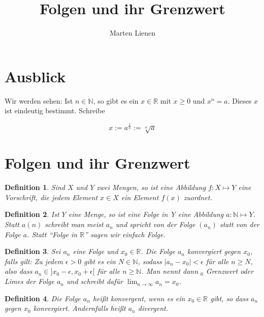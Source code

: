 \documentclass[a4paper,10pt]{article}
\title{Folgen und ihr Grenzwert}
\author{Marten Lienen}
\newtheorem{definition}{Definition}
\begin{document}
\maketitle

\section*{Ausblick}

Wir werden sehen: Ist $n \in \mathbb{N}$, so gibt es ein $x \in \mathbb{R}$ mit $x \ge 0$ und $x^n = a$.
Dieses $x$ ist eindeutig bestimmt. Schreibe

\begin{equation}
 x := a^{\frac{1}{n}} := \sqrt[n]{a}
\end{equation}

\section{Folgen und ihr Grenzwert}

\begin{definition}
 Sind $X$ und $Y$ zwei Mengen, so ist eine Abbildung $f: X \mapsto Y$ eine Vorschrift, die jedem Element $x \in X$ ein Element $f(x)$ zuordnet.
\end{definition}

\begin{definition}
 Ist $Y$ eine Menge, so ist eine Folge in Y eine Abbildung $a: \mathbb{N} \mapsto Y$.
 Statt $a(n)$ schreibt man meist $a_n$ und spricht von der Folge $(a_n)$ statt von der Folge $a$.
 Statt ``Folge in $\mathbb{R}$'' sagen wir einfach Folge.
\end{definition}

\begin{definition}
 Sei $a_n$ eine Folge und $x_0 \in \mathbb{R}$.
 Die Folge $a_n$ konvergiert gegen $x_0$, falls gilt: Zu jedem $\epsilon > 0$ gibt es ein $N \in \mathbb{N}$, sodass $|a_n - x_0| < \epsilon$ für alle $n \ge N$, also dass $a_n \in ]x_0 - \epsilon, x_0 + \epsilon[$ für alle $n \ge \mathbb{N}$.
 Man nennt dann $_0$ Grenzwert oder Limes der Folge $a_n$ und schreibt dafür $\lim_{n \rightarrow \infty} a_n = x_0$. 
\end{definition}

\begin{definition}
 Die Folge $a_n$ heißt konvergent, wenn es ein $x_0 \in \mathbb{R}$ gibt, so dass $a_n$ gegen $x_0$ konvergiert.
 Andernfalls heißt $a_n$ divergent.
\end{definition}
\end{document}
